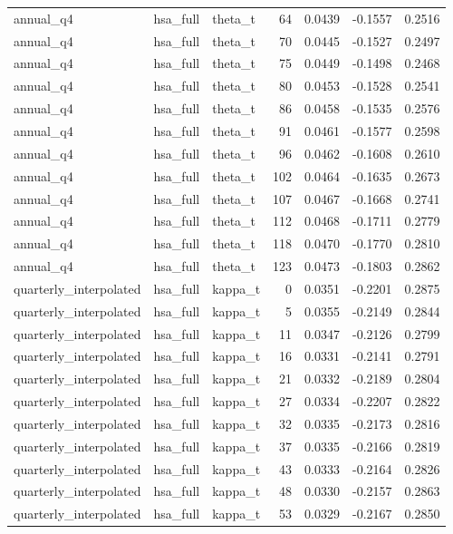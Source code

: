 \begin{tabular}{lllrrrr}
annual\_q4 & hsa\_full & theta\_t & 64 & 0.0439 & -0.1557 & 0.2516 \\
annual\_q4 & hsa\_full & theta\_t & 70 & 0.0445 & -0.1527 & 0.2497 \\
annual\_q4 & hsa\_full & theta\_t & 75 & 0.0449 & -0.1498 & 0.2468 \\
annual\_q4 & hsa\_full & theta\_t & 80 & 0.0453 & -0.1528 & 0.2541 \\
annual\_q4 & hsa\_full & theta\_t & 86 & 0.0458 & -0.1535 & 0.2576 \\
annual\_q4 & hsa\_full & theta\_t & 91 & 0.0461 & -0.1577 & 0.2598 \\
annual\_q4 & hsa\_full & theta\_t & 96 & 0.0462 & -0.1608 & 0.2610 \\
annual\_q4 & hsa\_full & theta\_t & 102 & 0.0464 & -0.1635 & 0.2673 \\
annual\_q4 & hsa\_full & theta\_t & 107 & 0.0467 & -0.1668 & 0.2741 \\
annual\_q4 & hsa\_full & theta\_t & 112 & 0.0468 & -0.1711 & 0.2779 \\
annual\_q4 & hsa\_full & theta\_t & 118 & 0.0470 & -0.1770 & 0.2810 \\
annual\_q4 & hsa\_full & theta\_t & 123 & 0.0473 & -0.1803 & 0.2862 \\
quarterly\_interpolated & hsa\_full & kappa\_t & 0 & 0.0351 & -0.2201 & 0.2875 \\
quarterly\_interpolated & hsa\_full & kappa\_t & 5 & 0.0355 & -0.2149 & 0.2844 \\
quarterly\_interpolated & hsa\_full & kappa\_t & 11 & 0.0347 & -0.2126 & 0.2799 \\
quarterly\_interpolated & hsa\_full & kappa\_t & 16 & 0.0331 & -0.2141 & 0.2791 \\
quarterly\_interpolated & hsa\_full & kappa\_t & 21 & 0.0332 & -0.2189 & 0.2804 \\
quarterly\_interpolated & hsa\_full & kappa\_t & 27 & 0.0334 & -0.2207 & 0.2822 \\
quarterly\_interpolated & hsa\_full & kappa\_t & 32 & 0.0335 & -0.2173 & 0.2816 \\
quarterly\_interpolated & hsa\_full & kappa\_t & 37 & 0.0335 & -0.2166 & 0.2819 \\
quarterly\_interpolated & hsa\_full & kappa\_t & 43 & 0.0333 & -0.2164 & 0.2826 \\
quarterly\_interpolated & hsa\_full & kappa\_t & 48 & 0.0330 & -0.2157 & 0.2863 \\
quarterly\_interpolated & hsa\_full & kappa\_t & 53 & 0.0329 & -0.2167 & 0.2850 \\

\end{tabular}
